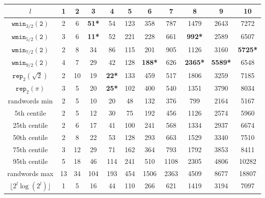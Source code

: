\documentclass{template_arxiv}
\numberwithin{equation}{section}
\newcommand{\wmin}{\mathtt{wmin}}
\newcommand{\rep}{\mathtt{rep}}
\begin{document}
\begin{center}
	{\small
		\begin{tabular}{|c||c|c|c|c|c|c|c|c|c|c|}
			\hline
			$l$ & 1 & 2 & 3 & 4 & 5 & 6 & 7 & 8 & 9 & 10  \\
			\hline \hline
			$\wmin_{3/2}(\mathtt{2})$ & 2 & 6 & \textbf{51*} & 54 & 123 & 358 & 787 & 1479 & 2643 & 7272  \\
			\hline
			$\wmin_{5/2}(\mathtt{2})$ & 3 & 6 & \textbf{11*} & 52 & 221 & 228 & 661 & \textbf{992*} & 2589 & 6507  \\
			\hline
			$\wmin_{7/2}(\mathtt{2})$ & 2 & 8 & 34 & 86 & 115 & 201 & 905 & 1126 & 3160 & \textbf{5725*}  \\
			\hline
			$\wmin_{9/2}(\mathtt{2})$ & 4 & 7 & 29 & 42 & 128 & \textbf{188*} & 626 & \textbf{2365*} & \textbf{5589*} & 6548  \\
			\hline
			$\rep_2(\sqrt{2})$ & 2 & 10 & 19 & \textbf{22*} & 133 & 459 & 517 & 1806 & 3259 & 7185 \\
			\hline
			$\rep_2(\pi)$ & 3 & 5 & 20 & \textbf{25*} & 102 & 400 & 540 & 1351 & 3790 & 8034  \\
			\hline
			randwords min & 2 & 5 & 10 & 20 & 48 & 132 & 376 & 799 & 2164 & 5167 \\
			\hline
			5th centile & 2 & 5 & 12 & 30 & 75 & 192 & 456 & 1126 & 2574 & 5960 \\
			\hline
			25th centile & 2 & 6 & 17 & 41 & 100 & 241 & 568 & 1334 & 2937 & 6674\\
			\hline
			50th centile & 2 & 8 & 22 & 53 & 128 & 293 & 663 & 1529 & 3340 & 7510 \\
			\hline
			75th centile & 3 & 12 & 29 & 71 & 162 & 364 & 793 & 1792 & 3853 & 8411 \\
			\hline
			95th centile & 5 & 18 & 46 & 114 & 241 & 510 & 1108 & 2305 & 4806 & 10282 \\
			\hline
			randwords max & 13 & 34 & 104 & 193 & 454 & 1506 & 2363 & 4509 & 8677 & 18807 \\
			\hline
			$\lfloor 2^l\log(2^l)\rfloor$ & 1 & 5 & 16 & 44 & 110 & 266 & 621 & 1419 & 3194 & 7097  \\
			\hline
		\end{tabular}
		
}
\end{center}
\end{document}

